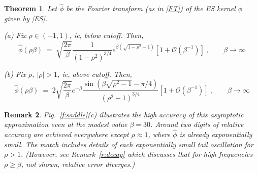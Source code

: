 \documentclass[10pt]{article}
\newcommand{\be}{\begin{equation}}
\newcommand{\ee}{\end{equation}}
\newcommand{\bigO}{{\mathcal O}}
\newtheorem{thm}{Theorem}
\newtheorem{rmk}[thm]{Remark}
\newcommand{\freq}{\beta}          %
\begin{document}
\begin{thm} %
  Let $\hat\phi$ be the Fourier transform (as in \eqref{FT}) of the ES kernel
  $\phi$ given by \eqref{ES}.
  
  (a)
  Fix $\rho\in(-1,1)$, ie, below cutoff. Then, %
\be
\hat\phi(\rho\freq) \; =\;
\sqrt{\frac{2\pi}{\beta}} \frac{1}{(1-\rho^2)^{3/4}} e^{\freq(\sqrt{1-\rho^2}-1)}
\left[ 1 + \bigO(\freq^{-1}) \right]
~, \qquad \freq\to\infty
\label{EShat1}
\ee

(b)
  Fix $\rho$, $|\rho| > 1$, ie, above cutoff. Then,
\be
\hat\phi(\rho\freq) \; =\;
2\sqrt{\frac{2\pi}{\beta}}
e^{-\freq}
\frac{\sin\left(\freq\sqrt{\rho^2-1} - \pi/4\right)}
{(\rho^2-1)^{3/4}}
\left[ 1 + \bigO(\freq^{-1}) \right]
~, \qquad \freq\to\infty
\label{EShat2}
\ee
\label{t:EShat}
\end{thm} %

\begin{rmk}
  Fig.~\ref{f:saddle}(c) illustrates the high accuracy of this
  asymptotic approximation even at the modest value $\freq=30$.
  Around two digits of {\em relative}
  accuracy are achieved everywhere except $\rho\approx 1$, where $\hat\phi$
  is already exponentially small.
  The match includes details of each exponentially small tail oscillation
  for $\rho>1$.
  (However, see Remark~\ref{r:decay} which discusses that for high frequencies
  $\rho \ge \freq$, not shown, relative error diverges.)
  \label{r:match}
\end{rmk}
\end{document}
